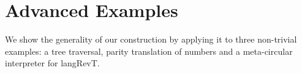 \documentclass{llncs}
\begin{document}
%







\section{Advanced Examples} 

We show the generality of our construction by applying it to three
non-trivial examples: a tree traversal, parity translation of numbers
and a meta-circular interpreter for {{langRevT}}.
\end{document}

